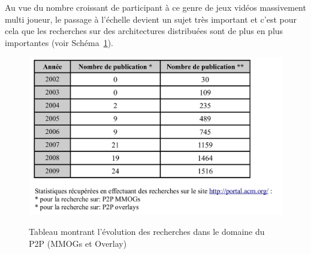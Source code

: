 	Au vue du nombre croissant de participant à ce genre de jeux vidéos massivement multi joueur, le passage à l'échelle devient un sujet très important et c'est pour cela que les recherches sur des architectures distribuées sont de plus en plus importantes (voir Schéma~\ref{stat_P2P}). \\
	\vspace{5mm} 
        \begin{figure}[!h]
        \centering
        \includegraphics[scale=0.85]{../Images/Stat_Rech_P2P.png}\\
        \caption{Tableau montrant l'évolution des recherches dans le domaine du P2P (MMOGs et Overlay)}
        \label{stat_P2P}
        \end{figure}
